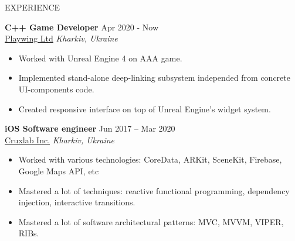 \documentclass{resume} %
\begin{document}
\begin{rSection}{EXPERIENCE}

\textbf{C++ Game Developer} \hfill Apr 2020 - Now \\
\href{https://playwing.com}{Playwing Ltd} \hfill \textit{Kharkiv, Ukraine}
 \begin{itemize}
    \itemsep -3pt {}
    \item Worked with Unreal Engine 4 on AAA game.
    \item Implemented stand-alone deep-linking subsystem independed from concrete UI-components code.
    \item Created responsive interface on top of Unreal Engine's widget system.
 \end{itemize}

\textbf{iOS Software engineer} \hfill Jun 2017 -- Mar 2020 \\
\href{https://cruxlab.com/}{Cruxlab Inc.} \hfill \textit{Kharkiv, Ukraine}
\begin{itemize}
    \itemsep -3pt {}
    \item Worked with various technologies: CoreData, ARKit, SceneKit, Firebase, Google Maps API, etc
    \item Mastered a lot of techniques: reactive functional programming, dependency injection, interactive transitions.
    \item Mastered a lot of software architectural patterns: MVC, MVVM, VIPER, RIBs.
\end{itemize}

\end{rSection}

\end{document}
